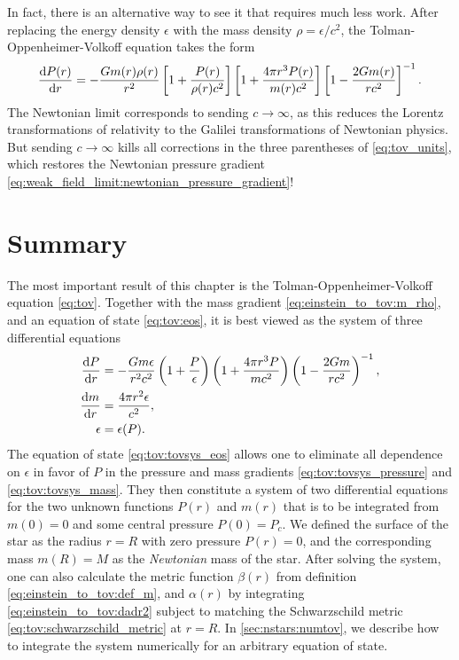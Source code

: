 In fact, there is an alternative way to see it that requires much less work.
After replacing the energy density $\epsilon$ with the mass density $\rho = \epsilon / c^2$, the Tolman-Oppenheimer-Volkoff equation takes the form
\begin{equation}
	\odv{P(r)}{r} = -\frac{G m(r) \rho(r)}{r^2} \left[ 1 + \frac{P(r)}{\rho(r) c^2} \right] \left[ 1 + \frac{4 \pi r^3 P(r)}{m(r) c^2} \right] \left[ 1 - \frac{2 G m(r)}{r c^2} \right]^{-1} .
	\label{eq:tov_units}
\end{equation}
The Newtonian limit corresponds to sending $c \rightarrow \infty$, as this reduces the Lorentz transformations of relativity to the Galilei transformations of Newtonian physics.
But sending $c \rightarrow \infty$ kills all corrections in the three parentheses of \cref{eq:tov_units}, which restores the Newtonian pressure gradient \eqref{eq:weak_field_limit:newtonian_pressure_gradient}!


\section{Summary}

The most important result of this chapter is the Tolman-Oppenheimer-Volkoff equation \eqref{eq:tov}.
Together with the mass gradient \eqref{eq:einstein_to_tov:m_rho}, and an equation of state \eqref{eq:tov:eos}, it is best viewed as the system of three differential equations
\begin{subequations}
\label{eq:tov:tovsys}
\begin{align}
	\odv{P}{r} &= -\frac{G m \epsilon}{r^2 c^2} \left( 1 + \frac{P}{\epsilon} \right) \left( 1 + \frac{4 \pi r^3 P}{m c^2} \right) \left( 1 - \frac{2 G m}{r c^2} \right)^{-1} , \label{eq:tov:tovsys_pressure} \\
	\odv{m}{r} &= \frac{4 \pi r^2 \epsilon}{c^2} , \label{eq:tov:tovsys_mass} \\
	\epsilon &= \epsilon(P) . \label{eq:tov:tovsys_eos}
\end{align}
\end{subequations}
The equation of state \eqref{eq:tov:tovsys_eos} allows one to eliminate all dependence on $\epsilon$ in favor of $P$ in the pressure and mass gradients \eqref{eq:tov:tovsys_pressure} and \eqref{eq:tov:tovsys_mass}.
They then constitute a system of two differential equations for the two unknown functions $P(r)$ and $m(r)$ that is to be integrated from $m(0) = 0$ and some central pressure $P(0) = P_c$.
We defined the surface of the star as the radius $r=R$ with zero pressure $P(r) = 0$, and the corresponding mass $m(R) = M$ as the \emph{Newtonian} mass of the star.
After solving the system, one can also calculate the metric function $\beta(r)$ from definition \eqref{eq:einstein_to_tov:def_m}, and $\alpha(r)$ by integrating \cref{eq:einstein_to_tov:dadr2} subject to matching the Schwarzschild metric \eqref{eq:tov:schwarzschild_metric} at $r=R$.
In \cref{sec:nstars:numtov}, we describe how to integrate the system numerically for an arbitrary equation of state.

